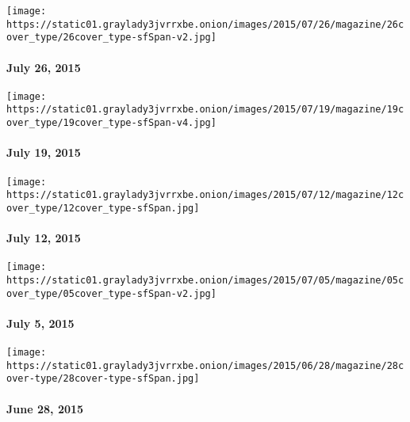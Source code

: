 \href{http://www.nytimes3xbfgragh.onion/indexes/2015/07/26/magazine/index.html}{}

\texttt{[image: https://static01.graylady3jvrrxbe.onion/images/2015/07/26/magazine/26cover\_type/26cover\_type-sfSpan-v2.jpg]}

\hypertarget{july-26-2015}{%
\paragraph{July 26, 2015}\label{july-26-2015}}

\href{http://www.nytimes3xbfgragh.onion/indexes/2015/07/19/magazine/index.html}{}

\texttt{[image: https://static01.graylady3jvrrxbe.onion/images/2015/07/19/magazine/19cover\_type/19cover\_type-sfSpan-v4.jpg]}

\hypertarget{july-19-2015}{%
\paragraph{July 19, 2015}\label{july-19-2015}}

\href{http://www.nytimes3xbfgragh.onion/indexes/2015/07/12/magazine/index.html}{}

\texttt{[image: https://static01.graylady3jvrrxbe.onion/images/2015/07/12/magazine/12cover\_type/12cover\_type-sfSpan.jpg]}

\hypertarget{july-12-2015}{%
\paragraph{July 12, 2015}\label{july-12-2015}}

\href{http://www.nytimes3xbfgragh.onion/indexes/2015/07/05/magazine/index.html}{}

\texttt{[image: https://static01.graylady3jvrrxbe.onion/images/2015/07/05/magazine/05cover\_type/05cover\_type-sfSpan-v2.jpg]}

\hypertarget{july-5-2015}{%
\paragraph{July 5, 2015}\label{july-5-2015}}

\href{http://www.nytimes3xbfgragh.onion/indexes/2015/06/28/magazine/index.html}{}

\texttt{[image: https://static01.graylady3jvrrxbe.onion/images/2015/06/28/magazine/28cover-type/28cover-type-sfSpan.jpg]}

\hypertarget{june-28-2015}{%
\paragraph{June 28, 2015}\label{june-28-2015}}

